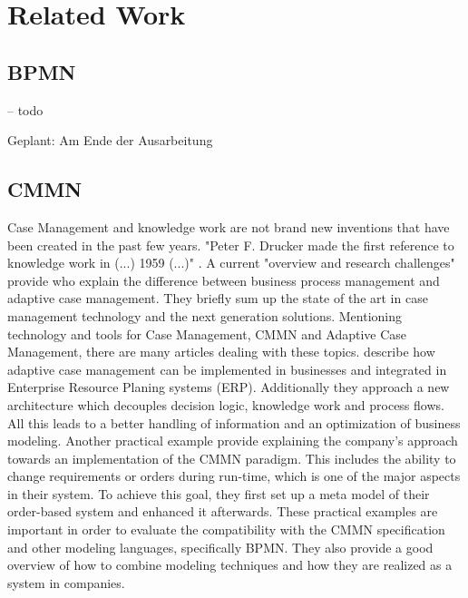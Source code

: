 \chapter{Related Work}
\label{chapter:related work}

\section{BPMN}
 -- todo 
 
 Geplant: Am Ende der Ausarbeitung 
 
 
\section{CMMN}
Case Management and knowledge work are not brand new inventions that have been created in the past few years. "Peter F. Drucker made the first reference to knowledge work in (...) 1959 (...)" \cite{Motahari-NezhadSwenson2013}. A current "overview and research challenges" provide \cite{Motahari-NezhadSwenson2013} who explain the difference between business process management and adaptive case management. They briefly sum up the state of the art in case management technology and the next generation solutions. 
Mentioning technology and tools for Case Management, CMMN and Adaptive Case Management, there are many articles dealing with these topics. \cite{OsuszekStanek2015} describe how adaptive case management can be implemented in businesses and integrated in Enterprise Resource Planing systems (ERP). Additionally they approach a new architecture which decouples decision logic, knowledge work and process flows. All this leads to a better handling of information and an optimization of business modeling. 
Another practical example provide \cite{Kuzin2013} explaining the company's approach towards an implementation of the CMMN paradigm. This includes the ability to change requirements or orders during run-time, which is one of the major aspects in their system. To achieve this goal, they first set up a meta model of their order-based system and enhanced it afterwards. 
These practical examples are important in order to evaluate the compatibility with the CMMN specification and other modeling languages, specifically BPMN. They also provide a good overview of how to combine modeling techniques and how they are realized as a system in companies. 
